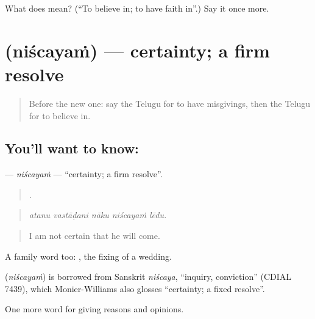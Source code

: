 \begin{tcolorbox}[breakable,colback=teal!4,colframe=teal!35!black,title={Before you move on}]
What does  mean? (\textquotedblleft{}To believe in; to have faith in\textquotedblright{}.) Say it once more.
\end{tcolorbox}
\section[\texorpdfstring{\te{నిశ్చయం} (niścayaṁ)}{నిశ్చయం (niścayaṁ)}]{ (niścayaṁ) — certainty; a firm resolve}

\label{lesson:TE-C388-niscayam}



\begin{quote}
Before the new one: say the Telugu for to have misgivings, then the Telugu for to believe in.
\end{quote}

\subsection*{You'll want to know: }
\textbf{} — \emph{niścayaṁ} — \textquotedblleft{}certainty; a firm resolve\textquotedblright{}.

\begin{quote}
    .
\end{quote}

\begin{quote}
\emph{atanu vastāḍani nāku niścayaṁ lēdu.}
\end{quote}

\begin{quote}
I am not certain that he will come.
\end{quote}

A family word too:  , the fixing of a wedding.

\begin{cousinweb}
\textbf{} (\emph{niścayaṁ}) is borrowed from Sanskrit \emph{niścaya}, \textquotedblleft{}inquiry, conviction\textquotedblright{} (CDIAL 7439), which Monier-Williams also glosses \textquotedblleft{}certainty; a fixed resolve\textquotedblright{}.
\end{cousinweb}

\begin{grammarlens}[title={What you've built}]
One more word for giving reasons and opinions.
\end{grammarlens}

